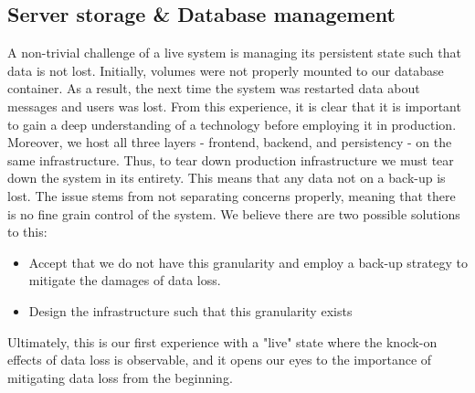 \subsection{Server storage \& Database management}

A non-trivial challenge of a live system is managing its persistent state such that data is not lost.
Initially, volumes were not properly mounted to our database container.
As a result, the next time the system was restarted data about messages and users was lost.
From this experience, it is clear that it is important to gain a deep understanding of a technology before employing it in production.
Moreover, we host all three layers - frontend, backend, and persistency - on the same infrastructure.
Thus, to tear down production infrastructure we must tear down the system in its entirety.
This means that any data not on a back-up is lost.
The issue stems from not separating concerns properly, meaning that there is no fine grain control of the system.
We believe there are two possible solutions to this: 

\begin{itemize}
    \item Accept that we do not have this granularity and employ a back-up strategy to mitigate the damages of data loss.
    \item Design the infrastructure such that this granularity exists
\end{itemize}

Ultimately, this is our first experience with a "live" state where the knock-on effects of data loss is observable, and it opens our eyes to the importance of mitigating data loss from the beginning.
